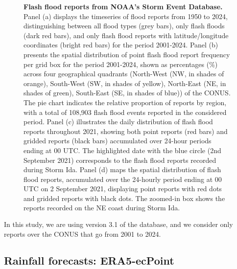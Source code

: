 \begin{figure}[htbp]
\caption{\textbf{Flash flood reports from NOAA's Storm Event Database.} Panel (a) displays the timeseries of flood reports from 1950 to 2024, distinguishing between all flood types (grey bars), only flash floods (dark red bars), and only flash flood reports with latitude/longitude coordinates (bright red bars) for the period 2001-2024. Panel (b) presents the spatial distribution of point flash flood report frequency per grid box for the period 2001-2024, shown as percentages (\%) across four geographical quadrants (North-West (NW, in shades of orange), South-West (SW, in shades of yellow), North-East (NE, in shades of green), South-East (SE, in shades of blue)) of the CONUS. The pie chart indicates the relative proportion of reports by region, with a total of 108,903 flash flood events reported in the considered period. Panel (c) illustrates the daily distribution of flash flood reports throughout 2021, showing both point reports (red bars) and gridded reports (black bars) accumulated over 24-hour periods ending at 00 UTC. The highlighted date with the blue circle (2nd September 2021) corresponds to the flash flood reports recorded during Storm Ida. Panel (d) maps the spatial distribution of flash flood reports, accumulated over the 24-hourly period ending at 00 UTC on 2 September 2021, displaying point reports with red dots and gridded reports with black dots. The zoomed-in box shows the reports recorded on the NE coast during Storm Ida.}
\label{fig:sed_ff_reports}
\end{figure}

In this study, we are using version 3.1 of the database, and we consider only reports over the CONUS that go from 2001 to 2024. 


\subsection{Rainfall forecasts: ERA5-ecPoint}

